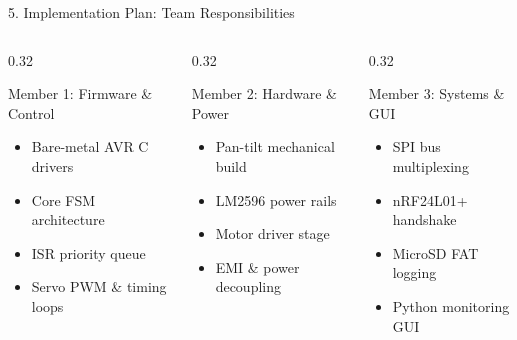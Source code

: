 \documentclass[aspectratio=169, 10pt]{beamer}
\begin{document}
\begin{frame}{5. Implementation Plan: Team Responsibilities}
    \begin{columns}[T]
        \begin{column}{0.32\textwidth}
            \begin{block}{Member 1: Firmware \& Control}
                \small
                \begin{itemize}
                    \item Bare-metal AVR C drivers
                    \item Core FSM architecture
                    \item ISR priority queue
                    \item Servo PWM \& timing loops
                \end{itemize}
            \end{block}
        \end{column}
        \begin{column}{0.32\textwidth}
            \begin{block}{Member 2: Hardware \& Power}
                \small
                \begin{itemize}
                    \item Pan-tilt mechanical build
                    \item LM2596 power rails
                    \item Motor driver stage
                    \item EMI \& power decoupling
                \end{itemize}
            \end{block}
        \end{column}
        \begin{column}{0.32\textwidth}
            \begin{block}{Member 3: Systems \& GUI}
                \small
                \begin{itemize}
                    \item SPI bus multiplexing
                    \item nRF24L01+ handshake
                    \item MicroSD FAT logging
                    \item Python monitoring GUI
                \end{itemize}
            \end{block}
        \end{column}
    \end{columns}
\end{frame}
\end{document}
